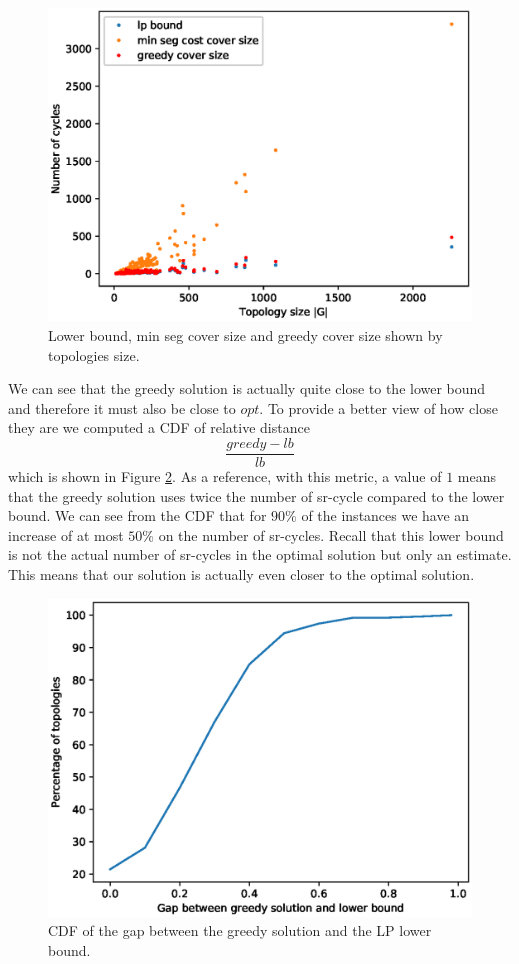 \begin{figure}
\begin{center}
\includegraphics[width=.9\columnwidth]{./Network-lib/data/plot/minCycleCover_lowerbound.eps}
\end{center}
\caption{Lower bound, min seg cover size and greedy cover size shown by topologies size.}
\label{fig:sizes_3}
\end{figure}

We can see that the greedy solution is actually quite close to the lower bound and therefore it must also be
close to $opt$. To provide a better view of how close they are we computed a CDF of relative distance 
$$
\frac{greedy - lb}{lb}
$$
which is shown in Figure \ref{fig:cc_gap_cdf}. As a reference, with this metric, a value of $1$ 
means that the greedy solution uses twice the number of sr-cycle compared to the lower bound. 
We can see from the CDF that for $90\%$ of the instances we have an increase of at most
$50\%$ on the number of sr-cycles. Recall that this lower bound is not the actual number of sr-cycles in the optimal solution
but only an estimate. This means that our solution is actually even closer to the optimal solution.

\begin{figure}
\begin{center}
\includegraphics[width=.9\columnwidth]{./Network-lib/data/plot/minCycleCover_gapcdf.eps}
\end{center}
\caption{CDF of the gap between the greedy solution and the LP lower bound.}
\label{fig:cc_gap_cdf}
\end{figure}

